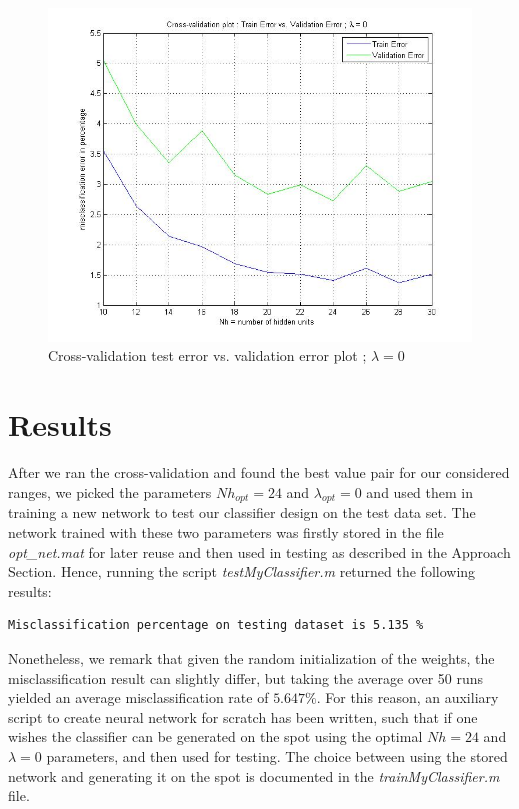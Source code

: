 \documentclass[a4paper,10pt]{article}
\begin{document}
\begin{figure}[ht!]
\centering
\includegraphics[scale=0.45]{cv_H}
\caption{Cross-validation test error vs. validation error plot ; $\lambda = 0$}\label{fig:cv_H}
\end{figure}

\section{Results}
After we ran the cross-validation and found the best value pair for our considered ranges, we picked the parameters $Nh_{opt} = 24$ and $\lambda_{opt} = 0$ and used them in training a new network to test our classifier design on the test data set. The network trained with these two parameters  was firstly stored in the file \textit{opt\_net.mat} for later reuse and then used in testing as described in the Approach Section. Hence, running the script \textit{testMyClassifier.m}  returned the following results:

\begin{verbatim}
Misclassification percentage on testing dataset is 5.135 %
\end{verbatim}

Nonetheless, we remark that given the random initialization of the weights, the misclassification result can slightly differ, but taking the average over 50 runs yielded an average misclassification rate of $5.647\%$.  For this reason, an auxiliary script to create neural network for scratch has been written, such that if one wishes the classifier can be generated on the spot using the optimal $Nh = 24$ and $\lambda = 0$ parameters, and then used for testing. The choice between using the stored network and generating it on the spot is documented in the \textit{trainMyClassifier.m} file.
\end{document}
